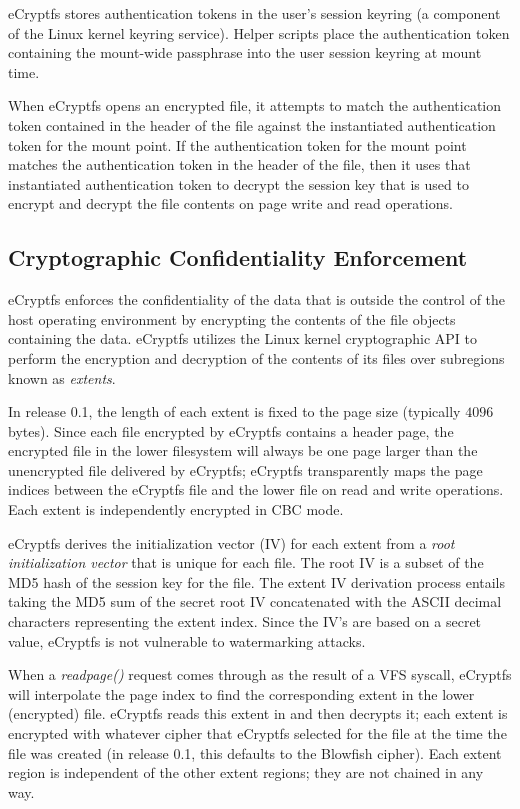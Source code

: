 \documentclass{article}
\begin{document}
eCryptfs stores authentication tokens in the user's session keyring (a
component of the Linux kernel keyring service). Helper scripts place
the authentication token containing the mount-wide passphrase into the
user session keyring at mount time.

When eCryptfs opens an encrypted file, it attempts to match the
authentication token contained in the header of the file against the
instantiated authentication token for the mount point. If the
authentication token for the mount point matches the authentication
token in the header of the file, then it uses that instantiated
authentication token to decrypt the session key that is used to
encrypt and decrypt the file contents on page write and read
operations.

\subsection{Cryptographic Confidentiality Enforcement}

eCryptfs enforces the confidentiality of the data that is outside the
control of the host operating environment by encrypting the contents
of the file objects containing the data. eCryptfs utilizes the Linux
kernel cryptographic API to perform the encryption and decryption of
the contents of its files over subregions known as \emph{extents}.

In release 0.1, the length of each extent is fixed to the page size
(typically $4096$ bytes). Since each file encrypted by eCryptfs
contains a header page, the encrypted file in the lower filesystem
will always be one page larger than the unencrypted file delivered by
eCryptfs; eCryptfs transparently maps the page indices between the
eCryptfs file and the lower file on read and write operations. Each
extent is independently encrypted in CBC mode.

eCryptfs derives the initialization vector (IV) for each extent from a
\emph{root initialization vector} that is unique for each file. The
root IV is a subset of the MD5 hash of the session key for the file.
The extent IV derivation process entails taking the MD5 sum of the
secret root IV concatenated with the ASCII decimal characters
representing the extent index. Since the IV's are based on a secret
value, eCryptfs is not vulnerable to watermarking attacks.

When a \emph{readpage()} request comes through as the result of a VFS
syscall, eCryptfs will interpolate the page index to find the
corresponding extent in the lower (encrypted) file. eCryptfs reads
this extent in and then decrypts it; each extent is encrypted with
whatever cipher that eCryptfs selected for the file at the time the
file was created (in release 0.1, this defaults to the Blowfish
cipher). Each extent region is independent of the other extent
regions; they are not chained in any way.
\end{document}

